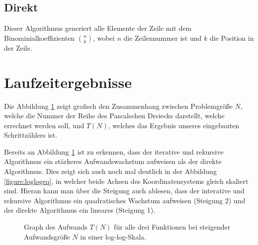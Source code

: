\documentclass[paper=a4, fontsize=10.5pt]{scrartcl} %
\numberwithin{equation}{section} %
\numberwithin{figure}{section} %
\numberwithin{table}{section} %
\begin{document}
\subsection{Direkt}
Dieser Algorithmus generiert alle Elemente der Zeile mit dem Binominialkoeffizienten
$\binom{n}{k}$, wobei $n$ die Zeilennummer ist und $k$ die Position in der Zeile.

\section{Laufzeitergebnisse}

Die Abbildung \ref{figure:loglog} zeigt grafisch den Zusammenhang zwischen
Problemgr\"o{\ss}e $N$, welche die Nummer der Reihe des Pascalschen Dreiecks darstellt,
welche errechnet werden soll, und $T(N)$, welches das Ergebnis unseres eingebauten
Schrittz\"ahlers ist.

Bereits an Abbildung \ref{figure:loglog} ist zu erkennen, dass der iterative und rekursive
Algorithmus ein st\"arkeres Aufwandswachstum aufweisen als der direkte Algorithmus.
Dies zeigt sich auch noch mal deutlich in der Abbildung \ref{figure:loglogeq},
in welcher beide Achsen des Koordinatensystems gleich skaliert sind. Hieran kann
man \"uber die Steigung auch ablesen, dass der interative und rekursive Algorithmus
ein quadratisches Wachstum aufweisen (Steigung 2) und der direkte Algorithmus
ein lineares (Steigung 1).

\begin{figure}[h]
  \centering
  \caption{Graph des Aufwands $T(N)$ f\"ur alle drei Funktionen bei steigender Aufwandsgr\"o{\ss}e $N$ in einer log-log-Skala.}
  \label{figure:loglog}
\end{figure}
\end{document}

